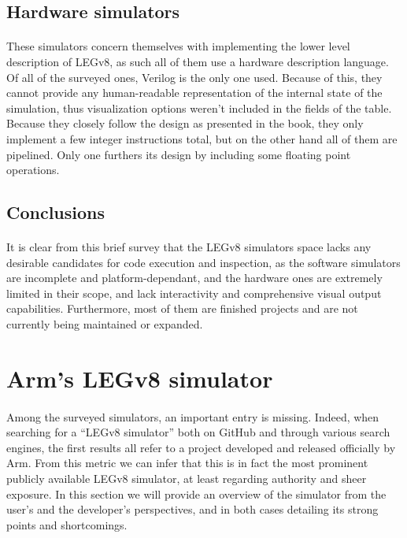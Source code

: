 \subsection{Hardware simulators}
\paragraph{}
These simulators concern themselves with implementing the lower level description of LEGv8, as such all of them use a hardware description language. Of all of the surveyed ones, Verilog is the only one used. Because of this, they cannot provide any human-readable representation of the internal state of the simulation, thus visualization options weren't included in the fields of the table. Because they closely follow the design as presented in the book, they only implement a few integer instructions total, but on the other hand all of them are pipelined. Only one furthers its design by including some floating point operations.

\subsection{Conclusions}
\paragraph{}
It is clear from this brief survey that the LEGv8 simulators space lacks any desirable candidates for code execution and inspection, as the software simulators are incomplete and platform-dependant, and the hardware ones are extremely limited in their scope, and lack interactivity and comprehensive visual output capabilities. Furthermore, most of them are finished projects and are not currently being maintained or expanded.

\section{Arm's LEGv8 simulator} \label{chap:chap1simoverview}
\paragraph{}
Among the surveyed simulators, an important entry is missing. Indeed, when searching for a ``LEGv8 simulator'' both on GitHub and through various search engines, the first results all refer to a project \cite{legv8simARMrepo} developed and released officially by Arm. From this metric we can infer that this is in fact the most prominent publicly available LEGv8 simulator, at least regarding authority and sheer exposure. In this section we will provide an overview of the simulator from the user's and the developer's perspectives, and in both cases detailing its strong points and shortcomings.

